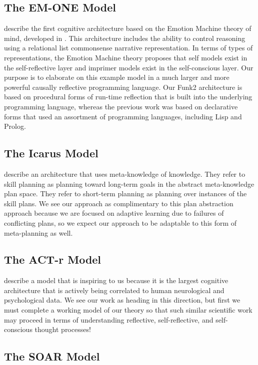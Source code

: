 \subsection{The EM-ONE Model}

\cite{singh2005one} describe the first cognitive architecture based on the Emotion Machine theory of mind, developed in \cite{minsky2006em}.
This architecture includes the ability to control reasoning using a relational list commonsense narrative representation.
In terms of types of representations, the Emotion Machine theory proposes that self models exist in the self-reflective layer and imprimer models exist in the self-conscious layer.
Our purpose is to elaborate on this example model in a much larger and more powerful causally reflective programming language.
Our Funk2 architecture is based on procedural forms of run-time reflection that is built into the underlying programming language, whereas the previous work was based on declarative forms that used an assortment of programming languages, including Lisp and Prolog.

\subsection{The Icarus Model}

\cite{langley2005aap} describe an architecture that uses meta-knowledge of knowledge.
They refer to skill planning as planning toward long-term goals in the abstract meta-knowledge plan space.
They refer to short-term planning as planning over instances of the skill plans.
We see our approach as complimentary to this plan abstraction approach because we are focused on adaptive learning due to failures of conflicting plans, so we expect our approach to be adaptable to this form of meta-planning as well.

\subsection{The ACT-r Model}

\cite{anderson2004itm} describe a model that is inspiring to us because it is the largest cognitive architecture that is actively being correlated to human neurological and psychological data.
We see our work as heading in this direction, but first we must complete a working model of our theory so that such similar scientific work may proceed in terms of understanding reflective, self-reflective, and self-conscious thought processes!

\subsection{The SOAR Model}

